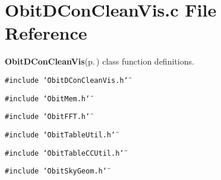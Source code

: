 \section{Obit\-DCon\-Clean\-Vis.c File Reference}
\label{ObitDConCleanVis_8c}
{\bf Obit\-DCon\-Clean\-Vis}{\rm (p.\,\pageref{structObitDConCleanVis})} class function definitions. 

{\tt \#include \char`\"{}Obit\-DCon\-Clean\-Vis.h\char`\"{}}\par
{\tt \#include \char`\"{}Obit\-Mem.h\char`\"{}}\par
{\tt \#include \char`\"{}Obit\-FFT.h\char`\"{}}\par
{\tt \#include \char`\"{}Obit\-Table\-Util.h\char`\"{}}\par
{\tt \#include \char`\"{}Obit\-Table\-CCUtil.h\char`\"{}}\par
{\tt \#include \char`\"{}Obit\-Sky\-Geom.h\char`\"{}}\par

